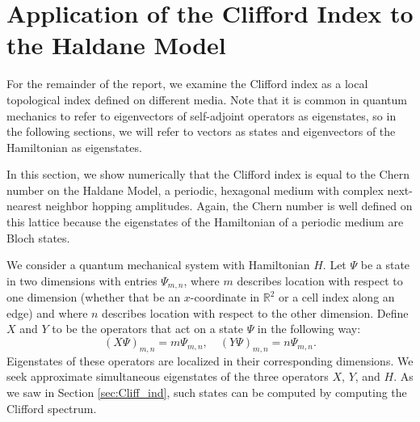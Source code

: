 \documentclass[a4paper]{article}
\begin{document}
\section{Application of the Clifford Index to the Haldane Model} \label{sec:Hald}

For the remainder of the report, we examine the Clifford index as a local topological index defined on different media.
Note that it is common in quantum mechanics to refer to eigenvectors of self-adjoint operators as eigenstates, so in the following sections, we will refer to vectors as states and eigenvectors of the Hamiltonian as eigenstates.

In this section, we show numerically that the Clifford index is equal to the Chern number on the Haldane Model, a periodic, hexagonal medium with complex next-nearest neighbor hopping amplitudes. Again, the Chern number is well defined on this lattice because the eigenstates of the Hamiltonian of a periodic medium are Bloch states.

We consider a quantum mechanical system with Hamiltonian $H$. Let $\Psi$ be a state in two dimensions with entries $\Psi_{m,n}$, where $m$ describes location with respect to one dimension (whether that be an $x$-coordinate in $\mathbb{R}^2$ or a cell index along an edge) and where $n$ describes location with respect to the other dimension.
Define $X$ and $Y$ to be the operators that act on a state $\Psi$ in the following way:
$$(X \Psi)_{m,n} = m\Psi_{m,n}, \quad (Y \Psi)_{m,n} = n\Psi_{m,n}.$$
Eigenstates of these operators are localized in their corresponding dimensions. We seek approximate simultaneous eigenstates of the three operators $X$, $Y$, and $H$. As we saw in Section \ref{sec:Cliff_ind}, such states can be computed by computing the Clifford spectrum.
\end{document}
